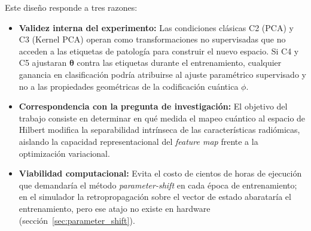 Este diseño responde a tres razones:
\begin{itemize}
  \item \textbf{Validez interna del experimento:} Las condiciones clásicas C2 (PCA) y
        C3 (Kernel PCA) operan como transformaciones no supervisadas que no acceden a las
        etiquetas de patología para construir el nuevo espacio. Si C4 y C5 ajustaran
        $\boldsymbol{\theta}$ contra las etiquetas durante el entrenamiento, cualquier
        ganancia en clasificación podría atribuirse al ajuste paramétrico supervisado y no
        a las propiedades geométricas de la codificación cuántica $\phi$.
  \item \textbf{Correspondencia con la pregunta de investigación:} El objetivo del trabajo
        consiste en determinar en qué medida el mapeo cuántico al espacio de Hilbert modifica
        la separabilidad intrínseca de las características radiómicas, aislando la capacidad
        representacional del \textit{feature map} frente a la optimización variacional.
  \item \textbf{Viabilidad computacional:} Evita el costo de cientos de horas de ejecución
        que demandaría el método \textit{parameter-shift} en cada época de entrenamiento; en el simulador la retropropagación sobre el vector de estado abarataría el entrenamiento, pero ese atajo no existe en hardware (sección~\ref{sec:parameter_shift}).
\end{itemize}
